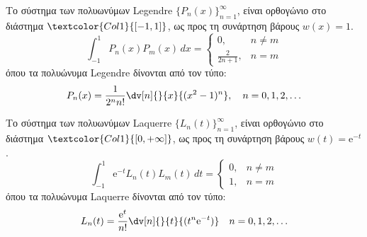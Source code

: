 \begin{prop}
  Το σύστημα των πολυωνύμων Legendre $ \{P_{n}(x)\}_{n=1}^{\infty} $, είναι ορθογώνιο 
  στο διάστημα $ \textcolor{Col1}{[-1,1]} $, ως προς τη συνάρτηση βάρους $ w(x)=1 $.
  \[
    \int _{-1}^{1} P_{n}(x)P_{m}(x) \,{dx} = 
    \begin{cases}  
      0, & n \neq m \\
      \frac{2}{2n+1}, & n=m
    \end{cases}
  \] 
  όπου τα πολυώνυμα Legendre δίνονται από τον τύπο:
  \[
    P_{n}(x) = \frac{1}{2^{n} n!} \dv[n]{}{x} {(x^{2}-1)^{n}}, 
    \quad n=0,1,2,\ldots
  \]
\end{prop}

\begin{prop}
  Το σύστημα των πολυωνύμων Laquerre $ \{L_{n}(t)\}_{n=1}^{\infty} $, είναι ορθογώνιο 
  στο διάστημα $ \textcolor{Col1}{[0,+\infty]} $, ως προς τη συνάρτηση βάρους 
  $ w(t)= \mathrm{e}^{-t} $.
  \[
    \int _{-1}^{1} \mathrm{e}^{-t}  L_{n}(t)L_{m}(t) \,{dt} = 
    \begin{cases}  
      0, & n \neq m \\
      1, & n=m
    \end{cases}
  \] 
  όπου τα πολυώνυμα Laquerre δίνονται από τον τύπο:
  \[
    L_{n}(t) = \frac{\mathrm{e}^{t}}{n!} \dv[n]{}{t}{(t^{n} \mathrm{e}^{-t})}  
    \quad n=0,1,2,\ldots
  \] 
\end{prop}


